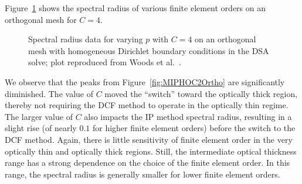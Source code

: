 \documentclass[12pt,letterpaper]{article}
\begin{document}
\FloatBarrier

Figure~\ref{fig:MIPHOC4Ortho} shows the spectral radius of various finite element orders on an orthogonal mesh for $C=4$.
%
\begin{figure}[!hbt]
\centering
{}
\caption{Spectral radius data for varying $p$ with $C=4$ on an orthogonal mesh with homogeneous Dirichlet boundary conditions in the DSA solve; plot reproduced from Woods et al.~\cite{WoodsDSA}.}
\label{fig:MIPHOC4Ortho}
\end{figure}
%
We observe that the peaks from Figure~\ref{fig:MIPHOC2Ortho} are significantly diminished. The value of $C$ moved the ``switch'' toward the optically thick region, thereby not requiring the DCF method to operate in the optically thin regime. The larger value of $C$ also impacts the IP method spectral radius, resulting in a slight rise (of nearly $0.1$ for higher finite element orders) before the switch to the DCF method. Again, there is little sensitivity of finite element order in the very optically thin and optically thick regions. Still, the intermediate optical thickness range has a strong dependence on the choice of the finite element order. In this range, the spectral radius is generally smaller for lower finite element orders.
\end{document}
